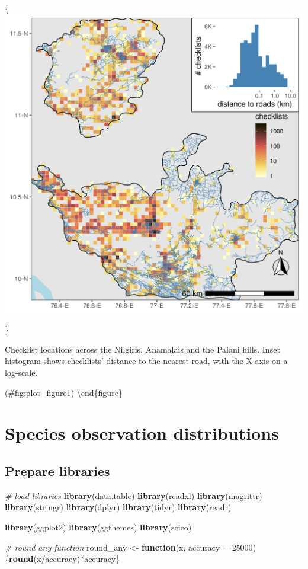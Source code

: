 \documentclass[]{article}
\newenvironment{Shaded}{}{}
\newcommand{\CommentTok}[1]{\textcolor[rgb]{0.38,0.63,0.69}{\textit{#1}}}
\newcommand{\ControlFlowTok}[1]{\textcolor[rgb]{0.00,0.44,0.13}{\textbf{#1}}}
\newcommand{\DataTypeTok}[1]{\textcolor[rgb]{0.56,0.13,0.00}{#1}}
\newcommand{\DecValTok}[1]{\textcolor[rgb]{0.25,0.63,0.44}{#1}}
\newcommand{\KeywordTok}[1]{\textcolor[rgb]{0.00,0.44,0.13}{\textbf{#1}}}
\newcommand{\NormalTok}[1]{#1}
\newcommand{\OperatorTok}[1]{\textcolor[rgb]{0.40,0.40,0.40}{#1}}
\newcommand{\StringTok}[1]{\textcolor[rgb]{0.25,0.44,0.63}{#1}}
\begin{document}
\{\centering \includegraphics[width=\textwidth]{figs/fig_distRoads}

\}

\caption{Checklist locations across the Nilgiris, Anamalais and the Palani hills. Inset histogram shows checklists' distance to the nearest road, with the X-axis on a log-scale.}

(\#fig:plot\_figure1)
\textbackslash{}end\{figure\}

\hypertarget{species-observation-distributions}{%
\section{Species observation distributions}\label{species-observation-distributions}}

\hypertarget{prepare-libraries-1}{%
\subsection{Prepare libraries}\label{prepare-libraries-1}}

\begin{Shaded}
\begin{Highlighting}[]
\CommentTok{# load libraries}
\KeywordTok{library}\NormalTok{(data.table)}
\KeywordTok{library}\NormalTok{(readxl)}
\KeywordTok{library}\NormalTok{(magrittr)}
\KeywordTok{library}\NormalTok{(stringr)}
\KeywordTok{library}\NormalTok{(dplyr)}
\KeywordTok{library}\NormalTok{(tidyr)}
\KeywordTok{library}\NormalTok{(readr)}

\KeywordTok{library}\NormalTok{(ggplot2)}
\KeywordTok{library}\NormalTok{(ggthemes)}
\KeywordTok{library}\NormalTok{(scico)}

\CommentTok{# round any function}
\NormalTok{round_any <-}\StringTok{ }\ControlFlowTok{function}\NormalTok{(x, }\DataTypeTok{accuracy =} \DecValTok{25000}\NormalTok{)\{}\KeywordTok{round}\NormalTok{(x}\OperatorTok{/}\NormalTok{accuracy)}\OperatorTok{*}\NormalTok{accuracy\}}
\end{Highlighting}
\end{Shaded}
\end{document}
